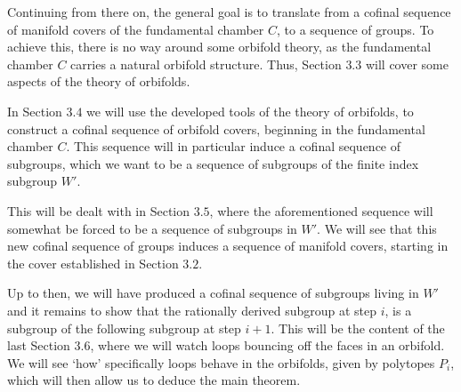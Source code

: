\noindent
Continuing from there on, the general goal is to translate from a cofinal sequence of manifold covers of the fundamental chamber \(C\), to a sequence of groups.
To achieve this, there is no way around some orbifold theory, as the fundamental chamber \(C\) carries a natural orbifold structure.
Thus, Section \(3.3\) will cover some aspects of the theory of orbifolds.

\noindent
In Section \(3.4\) we will use the developed tools of the theory of orbifolds, to construct a cofinal sequence of orbifold covers, beginning in the fundamental chamber \(C\).
This sequence will in particular induce a cofinal sequence of subgroups, which we want to be a sequence of subgroups of the finite index subgroup \(W'\).

\noindent
This will be dealt with in Section \(3.5\), where the aforementioned sequence will somewhat be forced to be a sequence of subgroups in \(W'\).
We will see that this new cofinal sequence of groups induces a sequence of manifold covers, starting in the cover established in Section \(3.2\).

\noindent
Up to then, we will have produced a cofinal sequence of subgroups living in \(W'\) and it remains to show that the rationally derived subgroup at step \(i\), is a subgroup of the following subgroup at step \(i+1\).
This will be the content of the last Section \(3.6\), where we will watch loops bouncing off the faces in an orbifold.
We will see `how' specifically loops behave in the orbifolds, given by polytopes \(P_i\), which will then allow us to deduce the main theorem. 